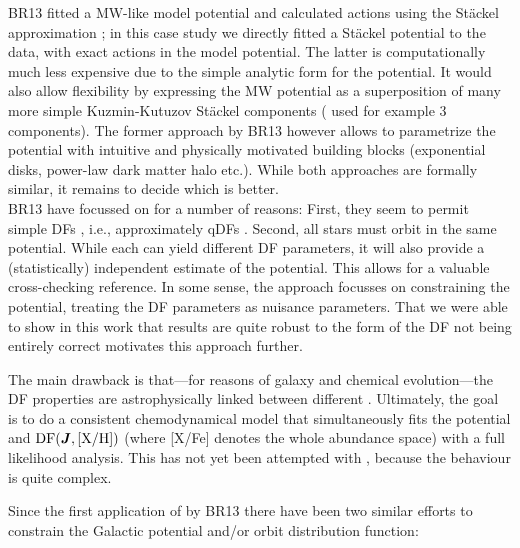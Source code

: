 BR13 fitted a MW-like model potential and calculated actions using the St\"{a}ckel approximation \citep{2012MNRAS.426.1324B}; in this case study we directly fitted a St\"{a}ckel potential to the data, with exact actions in the model potential. The latter is computationally much less expensive due to the simple analytic form for the potential. It would also allow flexibility by expressing the MW potential as a superposition of many more simple Kuzmin-Kutuzov St\"{a}ckel components (\citet{2003MNRAS.340..752F} used for example 3 components). The former approach by BR13 however allows to parametrize the potential with intuitive and physically motivated building blocks (exponential disks, power-law dark matter halo etc.). While both approaches are formally similar, it remains to decide which is better.\\

 BR13 have focussed on \MAPs{} for a number of reasons: First, they seem to permit simple DFs \citep{bov12b,bov12c,2012ApJ...753..148B}, i.e., approximately qDFs \citep{2013MNRAS.434..652T}. Second, all stars must orbit in the same potential. While each \MAP{} can yield different DF parameters, it will also provide a (statistically) independent estimate of the potential. This allows for a valuable cross-checking reference. In some sense, the\RM{} approach focusses on constraining the potential, treating the DF parameters as nuisance parameters. That we were able to show in this work that \RM{} results are quite robust to the form of the DF not being entirely correct motivates this approach further. 

The main drawback is that---for reasons of galaxy and chemical evolution---the DF properties are astrophysically linked between different \MAPs{}. Ultimately, the goal is to do a consistent chemodynamical model that simultaneously fits the potential and $\text{DF}(\boldsymbol{J},\text{[X/H]})$ (where [X/Fe] denotes the whole abundance space) with a full likelihood analysis. This has not yet been attempted with \RM{}, because the behaviour is quite complex. 

Since the first application of \RM{} by BR13 there have been two similar efforts to constrain the Galactic potential and/or orbit distribution function:

